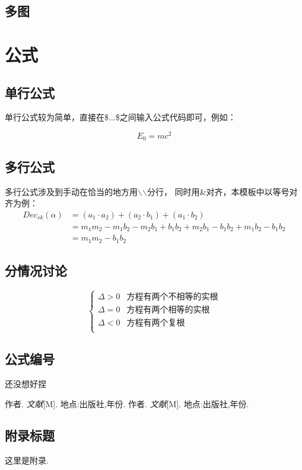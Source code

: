 \documentclass[12pt, a4paper, oneside]{ctexart}
\begin{document}
\subsection{多图}
\newpage

\section{公式}
\subsection{单行公式}
单行公式较为简单，直接在\$...\$之间输入公式代码即可，例如：\par
\begin{equation}
    E_0=mc^2
\end{equation}

\subsection{多行公式}
多行公式涉及到手动在恰当的地方用$\backslash$$\backslash$分行，
同时用\&对齐，本模板中以等号对齐为例：\\
\begin{equation}
    \begin{split}
        Dec_{sk}(\alpha)&=(a_1\cdot a_2)+(a_2\cdot b_1)+(a_1\cdot b_2)\\
        &= m_1m_2-m_1b_2-m_2b_1+b_1b_2+m_2b_1-b_1b_2+m_1b_2-b_1b_2\\
        &= m_1m_2-b_1b_2
    \end{split}
\end{equation}
\subsection{分情况讨论}

$$
    \begin{cases}
        \Delta >0 & \text{方程有两个不相等的实根} \\
        \Delta =0 & \text{方程有两个相等的实根}  \\
        \Delta <0 & \text{方程有两个复根}     \\
    \end{cases}
$$
\subsection{公式编号}
还没想好捏


\newpage
\begin{thebibliography}{99}
    作者. \emph{文献}[M]. 地点:出版社,年份.
    作者. \emph{文献}[M]. 地点:出版社,年份.
\end{thebibliography}

\begin{appendices}
    \renewcommand{\thesection}{\Alph{section}}
    \section{附录标题}
    这里是附录.
\end{appendices}
\end{document}
